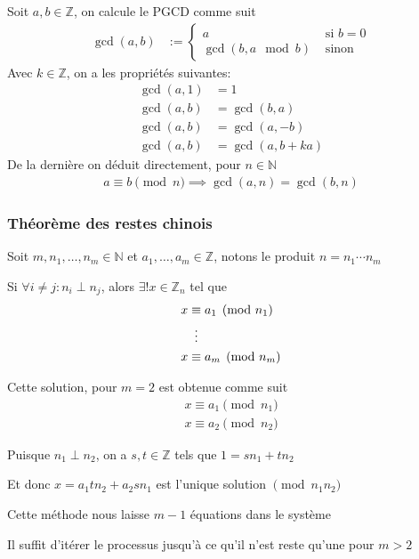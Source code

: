 \documentclass{article}
\begin{document}
Soit $a, b \in \mathbb{Z}$, on calcule le PGCD comme suit
\begin{align*}
    \gcd(a, b) & := \begin{cases}
        a & \text{ si $b = 0$} \\
        \gcd(b, a \mod b) & \text{ sinon}
    \end{cases}
\end{align*}
Avec $k \in \mathbb{Z}$, on a les propriétés suivantes:
\begin{align*}
    \gcd(a, 1) & = 1 \\
    \gcd(a, b) & = \gcd(b, a) \\
    \gcd(a, b) &= \gcd(a, -b) \\
    \gcd(a, b) & = \gcd(a, b + ka)
\end{align*}
De la dernière on déduit directement, pour $n \in \mathbb{N}$
\begin{align*}
        a \equiv b \pmod n \implies \gcd(a, n) = \gcd(b, n)
\end{align*}

\subsubsection{Théorème des restes chinois}

Soit $m, n_1, \dots, n_m \in \mathbb{N}$ et $a_1, \dots, a_m \in \mathbb{Z}$, notons le produit $n = n_1 \cdots n_m$

Si $\forall i \neq j : n_i \perp n_j$, alors $\exists!x \in \mathbb{Z}_n$ tel que
\begin{align*}
    x &\equiv a_1 \pmod {n_1} \\
    &\vdotswithin{\equiv} \\
    x &\equiv a_m \pmod {n_m}
\end{align*}

Cette solution, pour $m = 2$ est obtenue comme suit
\begin{align*}
    x \equiv a_1 \pmod {n_1} \\
    x \equiv a_2 \pmod {n_2}
\end{align*}

Puisque $n_1 \perp n_2$, on a $s, t \in \mathbb{Z}$ tels que $1 = sn_1 + tn_2$

Et donc $x = a_1tn_2 + a_2sn_1$ est l'unique solution $\pmod {n_1n_2}$

Cette méthode nous laisse $m - 1$ équations dans le système

Il suffit d'itérer le processus jusqu'à ce qu'il n'est reste qu'une pour $m > 2$
\end{document}

